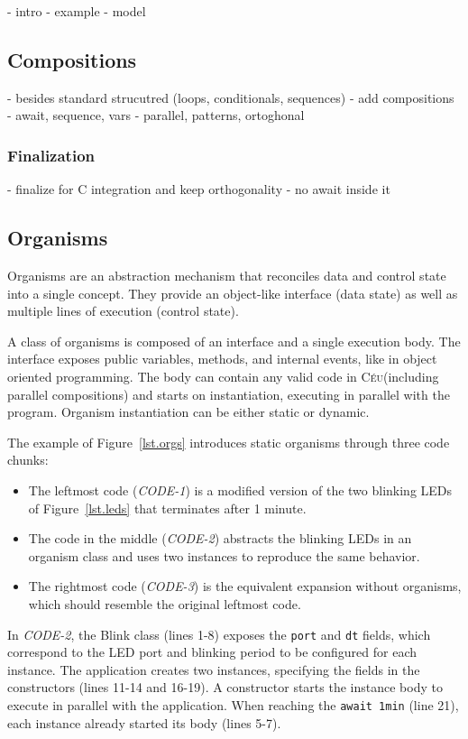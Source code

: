 \documentclass{acm_proc_article-sp}
\newcommand{\CEU}{\textsc{C\'{e}u}\xspace}
\newcommand{\code}[1] {{\small{\texttt{#1}}}}
\newcommand{\1}{\;}
\newcommand{\2}{\;\;}
\newcommand{\3}{\;\;\;}
\newcommand{\5}{\;\;\;\;\;}
\begin{document}
- intro
- example
- model

\subsection{Compositions}

- besides standard strucutred (loops, conditionals, sequences)
- add compositions
- await, sequence, vars
- parallel, patterns, ortoghonal

\subsubsection{Finalization}

- finalize for C integration and keep orthogonality
- no await inside it

\subsection{Organisms}


Organisms are an abstraction mechanism that reconciles data and control state 
into a single concept.
They provide an object-like interface (data state) as well as multiple lines of 
execution (control state).

A class of organisms is composed of an interface and a single execution body.  
The interface exposes public variables, methods, and internal events, like in 
object oriented programming.
The body can contain any valid code in \CEU (including parallel compositions) 
and starts on instantiation, executing in parallel with the program.
Organism instantiation can be either static or dynamic.

The example of Figure~\ref{lst.orgs} introduces static organisms through three 
code chunks:
%
\begin{itemize}
\item The leftmost code (\emph{CODE-1}) is a modified version of the two 
blinking LEDs of Figure~\ref{lst.leds} that terminates after 1 minute.
%
\item The code in the middle (\emph{CODE-2}) abstracts the blinking LEDs in an 
organism class and uses two instances to reproduce the same behavior.
%
\item The rightmost code (\emph{CODE-3}) is the equivalent expansion without 
organisms, which should resemble the original leftmost code.
\end{itemize}
%
In \emph{CODE-2}, the Blink class (lines 1-8) exposes the \code{port} and 
\code{dt} fields, which correspond to the LED port and blinking period to be 
configured for each instance.
The application creates two instances, specifying the fields in the 
constructors (lines 11-14 and 16-19).
A constructor starts the instance body to execute in parallel with the 
application.
When reaching the \code{await 1min} (line 21), each instance already started 
its body (lines 5-7).
\end{document}
